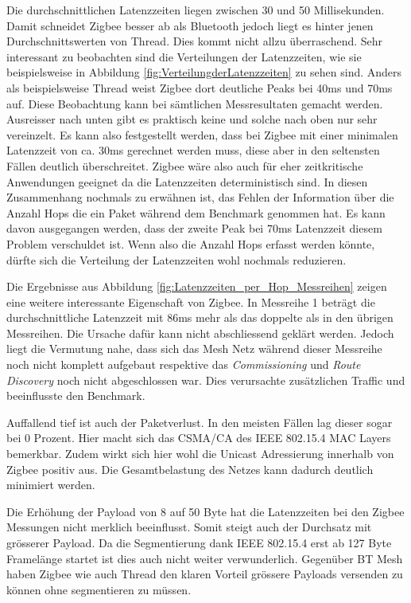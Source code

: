 Die durchschnittlichen Latenzzeiten liegen zwischen 30 und 50 Millisekunden. Damit schneidet Zigbee besser ab als Bluetooth jedoch liegt es hinter jenen Durchschnittswerten von Thread.
Dies kommt nicht allzu überraschend.
Sehr interessant zu beobachten sind die Verteilungen der Latenzzeiten, wie sie beispielsweise in Abbildung \ref{fig:VerteilungderLatenzzeiten} zu sehen sind.
Anders als beispielsweise Thread weist Zigbee dort deutliche Peaks bei 40ms und 70ms auf.
Diese Beobachtung kann bei sämtlichen Messresultaten gemacht werden.
Ausreisser nach unten gibt es praktisch keine und solche nach oben nur sehr vereinzelt.
Es kann also festgestellt werden, dass bei Zigbee mit einer minimalen Latenzzeit von ca. 30ms gerechnet werden muss, diese aber in den seltensten Fällen deutlich überschreitet.
Zigbee wäre also auch für eher zeitkritische Anwendungen geeignet da die Latenzzeiten deterministisch sind.
In diesen Zusammenhang nochmals zu erwähnen ist, das Fehlen der Information über die Anzahl Hops die ein Paket während dem Benchmark genommen hat.
Es kann davon ausgegangen werden, dass der zweite Peak bei 70ms Latenzzeit diesem Problem verschuldet ist.
Wenn also die Anzahl Hops erfasst werden könnte, dürfte sich die Verteilung der Latenzzeiten wohl nochmals reduzieren.

Die Ergebnisse aus Abbildung \ref{fig:Latenzzeiten_per_Hop_Messreihen} zeigen eine weitere interessante Eigenschaft von Zigbee.
In Messreihe 1 beträgt die durchschnittliche Latenzzeit mit 86ms mehr als das doppelte als in den übrigen Messreihen.
Die Ursache dafür kann nicht abschliessend geklärt werden.
Jedoch liegt die Vermutung nahe, dass sich das Mesh Netz während dieser Messreihe noch nicht komplett aufgebaut respektive das \textit{Commissioning} und \textit{Route Discovery} noch nicht abgeschlossen war.
Dies verursachte zusätzlichen Traffic und beeinflusste den Benchmark.

Auffallend tief ist auch der Paketverlust.
In den meisten Fällen lag dieser sogar bei 0 Prozent.
Hier macht sich das CSMA\slash CA des IEEE 802.15.4 MAC Layers bemerkbar.
Zudem wirkt sich hier wohl die Unicast Adressierung innerhalb von Zigbee positiv aus.
Die Gesamtbelastung des Netzes kann dadurch deutlich minimiert werden.

Die Erhöhung der Payload von 8 auf 50 Byte hat die Latenzzeiten bei den Zigbee Messungen nicht merklich beeinflusst.
Somit steigt auch der Durchsatz mit grösserer Payload.
Da die Segmentierung dank IEEE 802.15.4 erst ab 127 Byte Framelänge startet ist dies auch nicht weiter verwunderlich.
Gegenüber BT Mesh haben Zigbee wie auch Thread den klaren Vorteil grössere Payloads versenden zu können ohne segmentieren zu müssen.

